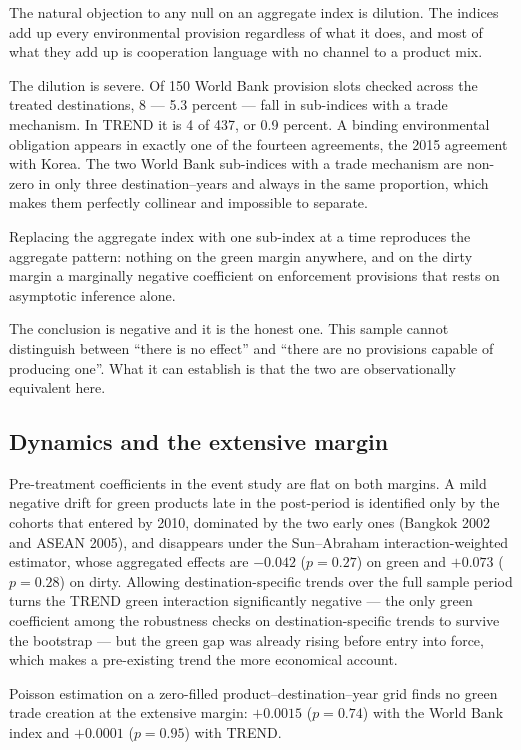 \documentclass[11pt]{article}
\begin{document}
The natural objection to any null on an aggregate index is dilution. The indices add up every
environmental provision regardless of what it does, and most of what they add up is cooperation
language with no channel to a product mix.

The dilution is severe. Of 150 World Bank provision slots checked across the treated destinations,
8 --- 5.3 percent --- fall in sub-indices with a trade mechanism. In TREND it is 4 of 437, or 0.9
percent. A binding environmental obligation appears in exactly one of the fourteen agreements, the
2015 agreement with Korea. The two World Bank sub-indices with a trade mechanism are non-zero in only
three destination--years and always in the same proportion, which makes them perfectly collinear and
impossible to separate.

Replacing the aggregate index with one sub-index at a time reproduces the aggregate pattern: nothing
on the green margin anywhere, and on the dirty margin a marginally negative coefficient on
enforcement provisions that rests on asymptotic inference alone.

The conclusion is negative and it is the honest one. This sample cannot distinguish between ``there
is no effect'' and ``there are no provisions capable of producing one''. What it can establish is
that the two are observationally equivalent here.

\subsection*{Dynamics and the extensive margin}

Pre-treatment coefficients in the event study are flat on both margins. A mild negative drift for
green products late in the post-period is identified only by the cohorts that entered by 2010,
dominated by the two early ones (Bangkok 2002 and ASEAN 2005), and disappears
under the Sun--Abraham interaction-weighted estimator, whose aggregated effects are $-0.042$
($p = 0.27$) on green and $+0.073$ ($p = 0.28$) on dirty. Allowing destination-specific trends over
the full sample period turns the TREND green interaction significantly negative --- the only
green coefficient among the robustness checks on destination-specific trends to survive the bootstrap --- but the green gap was
already rising before entry into force, which makes a pre-existing trend the more economical account.

Poisson estimation on a zero-filled product--destination--year grid finds no green trade creation at
the extensive margin: $+0.0015$ ($p = 0.74$) with the World Bank index and $+0.0001$ ($p = 0.95$)
with TREND.
\end{document}
